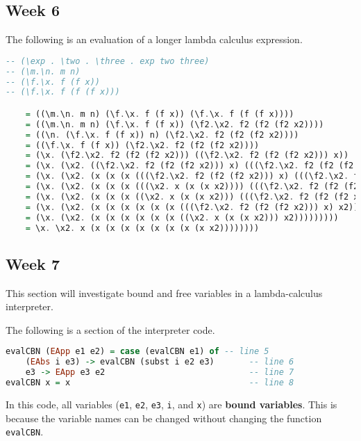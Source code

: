 \documentclass{article}
\theoremstyle{theorem}
\theoremstyle{definition}
\theoremstyle{remark}
\begin{document}
\subsection{Week 6}
The following is an evaluation of a longer lambda calculus expression.

\begin{lstlisting}[language=Haskell]
-- (\exp . \two . \three . exp two three)
-- (\m.\n. m n)
-- (\f.\x. f (f x))
-- (\f.\x. f (f (f x)))

    = ((\m.\n. m n) (\f.\x. f (f x)) (\f.\x. f (f (f x))))
    = ((\m.\n. m n) (\f.\x. f (f x)) (\f2.\x2. f2 (f2 (f2 x2))))
    = ((\n. (\f.\x. f (f x)) n) (\f2.\x2. f2 (f2 (f2 x2))))
    = ((\f.\x. f (f x)) (\f2.\x2. f2 (f2 (f2 x2))))
    = (\x. (\f2.\x2. f2 (f2 (f2 x2))) ((\f2.\x2. f2 (f2 (f2 x2))) x))
    = (\x. (\x2. ((\f2.\x2. f2 (f2 (f2 x2))) x) (((\f2.\x2. f2 (f2 (f2 x2))) x) (((\f2.\x2. f2 (f2 (f2 x2))) x) x2))))
    = (\x. (\x2. (x (x (x (((\f2.\x2. f2 (f2 (f2 x2))) x) (((\f2.\x2. f2 (f2 (f2 x2))) x) x2)))))))
    = (\x. (\x2. (x (x (x (((\x2. x (x (x x2)))) (((\f2.\x2. f2 (f2 (f2 x2))) x) x2)))))))
    = (\x. (\x2. (x (x (x ((\x2. x (x (x x2))) (((\f2.\x2. f2 (f2 (f2 x2))) x) x2)))))))
    = (\x. (\x2. (x (x (x (x (x (x (((\f2.\x2. f2 (f2 (f2 x2))) x) x2)))))))))
    = (\x. (\x2. (x (x (x (x (x (x ((\x2. x (x (x x2))) x2)))))))))
    = \x. \x2. x (x (x (x (x (x (x (x (x x2))))))))
\end{lstlisting}

\newpage

\subsection{Week 7}
This section will investigate bound and free variables in a lambda-calculus interpreter.

\noindent The following is a section of the interpreter code.
\begin{lstlisting}[language=Haskell]
evalCBN (EApp e1 e2) = case (evalCBN e1) of -- line 5
    (EAbs i e3) -> evalCBN (subst i e2 e3)       -- line 6
    e3 -> EApp e3 e2                             -- line 7
evalCBN x = x                                    -- line 8
\end{lstlisting}

\noindent In this code, all variables (\texttt{e1}, \texttt{e2}, \texttt{e3}, \texttt{i}, and \texttt{x}) are \textbf{bound variables}. This is because the variable names can be changed without changing the function \texttt{evalCBN}.
\end{document}
